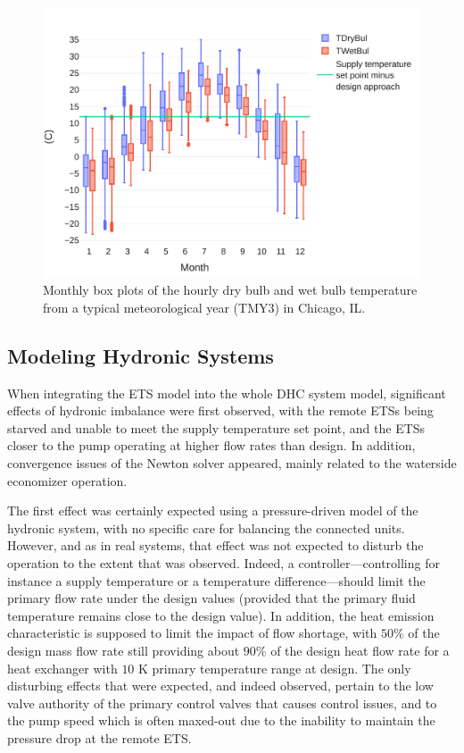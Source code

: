 \begin{figure}[!htbp]
    \centering
    \includegraphics[width=.7\linewidth]{../python_scripts/figures/weather_stats.pdf}
    \caption{Monthly box plots of the hourly dry bulb and wet bulb temperature from a typical meteorological year (TMY3) in Chicago, IL.}
    \label{fig:weather_stats}
\end{figure}


\subsection{Modeling Hydronic Systems} \label{sec:balancing}

When integrating the ETS model into the whole DHC system model, significant effects of hydronic imbalance were first observed, with the remote ETSs being starved and unable to meet the supply temperature set point, and the ETSs closer to the pump operating at higher flow rates than design.
In addition, convergence issues of the Newton solver appeared, mainly related to the waterside economizer operation.

The first effect was certainly expected using a pressure-driven model of the hydronic system, with no specific care for balancing the connected units. However, and as in real systems, that effect was not expected to disturb the operation to the extent that was observed. Indeed, a controller---controlling for instance a supply temperature or a temperature difference---should limit the primary flow rate under the design values (provided that the primary fluid temperature remains close to the design value). In addition, the heat emission characteristic is supposed to limit the impact of flow shortage, with $50\%$ of the design mass flow rate still providing about $90\%$ of the design heat flow rate for a heat exchanger with $10$ K primary temperature range at design. The only disturbing effects that were expected, and indeed observed, pertain to the low valve authority of the primary control valves that causes control issues, and to the pump speed which is often maxed-out due to the inability to maintain the pressure drop at the remote ETS.

